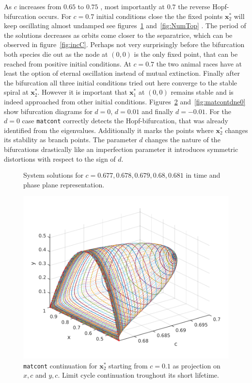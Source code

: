 As $c$ increases from $0.65$ to $0.75$ , most importantly at $0.7$ the reverse Hopf-bifurcation occurs. For $c = 0.7$ initial conditions close the the fixed points $\mathbf{x}_2^*$ will keep oscillating almost undamped see figures~\ref{[fig:incC]} and~\ref{fig:NumTop} . The period of the solutions decreases as orbits come closer to the separatrice, which can be observed in figure~\ref{fig:incC}.
Perhaps not very surprisingly before the bifurcation both species die out as the node at $(0,0)$ is the only fixed point, that can be reached from positive initial conditions. At $c = 0.7$ the two animal races have at least the option of eternal oscillation instead of mutual extinction. Finally after the bifurcation all three initial conditions tried out here converge to the stable spiral at $\mathbf{x}_2^*$. However it is important that $\mathbf{x}_1^*$ at $(0,0)$ remains stable and is indeed approached from other initial conditions. Figures~\ref{fig:matcontdeq0} and~\ref{fig:matcontdne0} show bifurcation diagrams for $d = 0$, $d = 0.01$ and finally $d = -0.01$. For the $d = 0$ case \texttt{matcont} correctly detects the Hopf-bifurcation, that was already identified from the eigenvalues. Additionally it marks the points where $\mathbf{x}_2^*$ changes its stability as branch points. The parameter $d$ changes the nature of the bifurcations drastically like an imperfection parameter it introduces symmetric distortions with respect to the sign of $d$.

\begin{figure}
\centering


\caption{System solutions for $c = 0.677, 0.678, 0.679, 0.68, 0.681$ in time and phase plane representation.}
\label{[fig:incC]}
\end{figure}

\begin{figure}
\centering


\includegraphics[scale=0.6]{./plots/hcCont.pdf}
\caption{\texttt{matcont} continuation for $\mathbf{x}_2^*$ starting from $c=0.1$ as projection on $x,c$ and $y,c$. Limit cycle continuation troughout its short lifetime.} 
\label{fig:matcontdeq0}
\end{figure}

